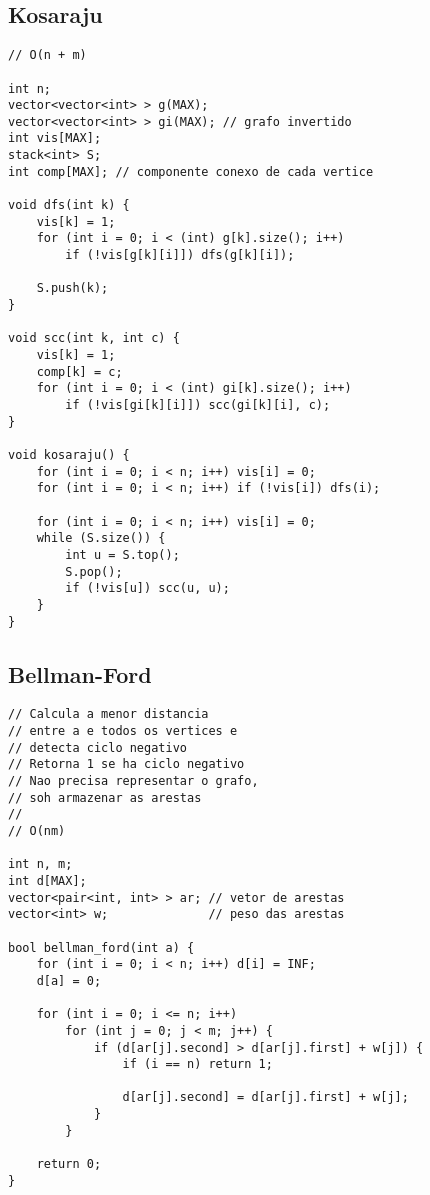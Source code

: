 \documentclass[12pt, a4paper, twoside]{article}
\begin{document}
\subsection{Kosaraju}
\begin{lstlisting}
// O(n + m)

int n;
vector<vector<int> > g(MAX);
vector<vector<int> > gi(MAX); // grafo invertido
int vis[MAX];
stack<int> S;
int comp[MAX]; // componente conexo de cada vertice

void dfs(int k) {
	vis[k] = 1;
	for (int i = 0; i < (int) g[k].size(); i++)
		if (!vis[g[k][i]]) dfs(g[k][i]);

	S.push(k);
}

void scc(int k, int c) {
	vis[k] = 1;
	comp[k] = c;
	for (int i = 0; i < (int) gi[k].size(); i++)
		if (!vis[gi[k][i]]) scc(gi[k][i], c);
}

void kosaraju() {
	for (int i = 0; i < n; i++) vis[i] = 0;
	for (int i = 0; i < n; i++) if (!vis[i]) dfs(i);

	for (int i = 0; i < n; i++) vis[i] = 0;
	while (S.size()) {
		int u = S.top();
		S.pop();
		if (!vis[u]) scc(u, u);
	}
}
\end{lstlisting}

\subsection{Bellman-Ford}
\begin{lstlisting}
// Calcula a menor distancia
// entre a e todos os vertices e
// detecta ciclo negativo
// Retorna 1 se ha ciclo negativo
// Nao precisa representar o grafo,
// soh armazenar as arestas
//
// O(nm)

int n, m;
int d[MAX];
vector<pair<int, int> > ar; // vetor de arestas
vector<int> w;              // peso das arestas

bool bellman_ford(int a) {
	for (int i = 0; i < n; i++) d[i] = INF;
	d[a] = 0;

	for (int i = 0; i <= n; i++)
		for (int j = 0; j < m; j++) {
			if (d[ar[j].second] > d[ar[j].first] + w[j]) {
				if (i == n) return 1;

				d[ar[j].second] = d[ar[j].first] + w[j];
			}
		}

	return 0;
}
\end{lstlisting}
\end{document}
